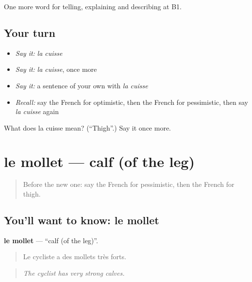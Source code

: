\begin{grammarlens}[title={What you've built}]
One more word for telling, explaining and describing at B1.
\end{grammarlens}

\subsection*{Your turn}
\begin{itemize}
\raggedright
  \item \emph{Say it:} \emph{la cuisse}
  \item \emph{Say it:} \emph{la cuisse}, once more
  \item \emph{Say it:} a sentence of your own with \emph{la cuisse}
  \item \emph{Recall:} say the French for optimistic, then the French for pessimistic, then say \emph{la cuisse} again
\end{itemize}

\begin{tcolorbox}[breakable,colback=teal!4,colframe=teal!35!black,title={Before you move on}]
What does la cuisse mean? (\textquotedblleft{}Thigh\textquotedblright{}.) Say it once more.
\end{tcolorbox}
\section[le mollet]{le mollet — calf (of the leg)}

\label{lesson:FR-C477-mollet}



\begin{quote}
Before the new one: say the French for pessimistic, then the French for thigh.
\end{quote}

\subsection*{You'll want to know: le mollet}
\textbf{le mollet} — \textquotedblleft{}calf (of the leg)\textquotedblright{}.

\begin{quote}
Le cycliste a des mollets très forts.
\end{quote}

\begin{quote}
\emph{The cyclist has very strong calves.}
\end{quote}

